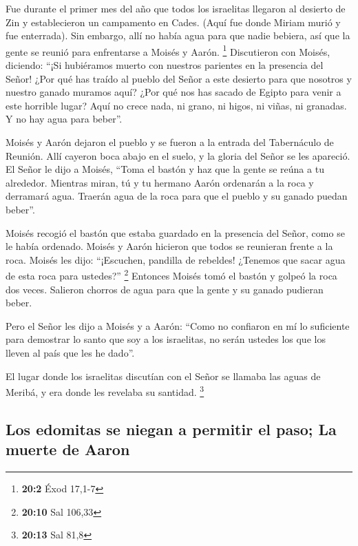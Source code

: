  Fue durante el primer mes del año que todos los
israelitas llegaron al desierto de Zin y establecieron un campamento en
Cades. (Aquí fue donde Miriam murió y fue enterrada).  Sin
embargo, allí no había agua para que nadie bebiera, así que la gente se
reunió para enfrentarse a Moisés y Aarón. \footnote{\textbf{20:2} Éxod
  17,1-7}  Discutieron con Moisés, diciendo: ``¡Si
hubiéramos muerto con nuestros parientes en la presencia del Señor!
 ¿Por qué has traído al pueblo del Señor a este desierto
para que nosotros y nuestro ganado muramos aquí?  ¿Por qué
nos has sacado de Egipto para venir a este horrible lugar? Aquí no crece
nada, ni grano, ni higos, ni viñas, ni granadas. Y no hay agua para
beber''.

 Moisés y Aarón dejaron el pueblo y se fueron a la entrada
del Tabernáculo de Reunión. Allí cayeron boca abajo en el suelo, y la
gloria del Señor se les apareció.  El Señor le dijo a
Moisés,  ``Toma el bastón y haz que la gente se reúna a tu
alrededor. Mientras miran, tú y tu hermano Aarón ordenarán a la roca y
derramará agua. Traerán agua de la roca para que el pueblo y su ganado
puedan beber''.

 Moisés recogió el bastón que estaba guardado en la
presencia del Señor, como se le había ordenado.  Moisés y
Aarón hicieron que todos se reunieran frente a la roca. Moisés les dijo:
``¡Escuchen, pandilla de rebeldes! ¿Tenemos que sacar agua de esta roca
para ustedes?'' \footnote{\textbf{20:10} Sal 106,33} 
Entonces Moisés tomó el bastón y golpeó la roca dos veces. Salieron
chorros de agua para que la gente y su ganado pudieran beber.

 Pero el Señor les dijo a Moisés y a Aarón: ``Como no
confiaron en mí lo suficiente para demostrar lo santo que soy a los
israelitas, no serán ustedes los que los lleven al país que les he
dado''.

 El lugar donde los israelitas discutían con el Señor se
llamaba las aguas de Meribá, y era donde les revelaba su santidad.
\footnote{\textbf{20:13} Sal 81,8}

\hypertarget{los-edomitas-se-niegan-a-permitir-el-paso-la-muerte-de-aaron}{%
\subsection{Los edomitas se niegan a permitir el paso; La muerte de
Aaron}\label{los-edomitas-se-niegan-a-permitir-el-paso-la-muerte-de-aaron}}

